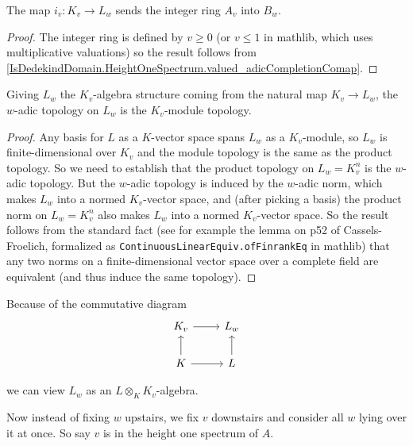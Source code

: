 \begin{theorem}
  \label{IsDedekindDomain.HeightOneSpectrum.adicCompletionComapSemialgHom.mapadicCompletionIntegers}
  \leanok
  The map $i_v:K_v\to L_w$ sends the integer ring $A_v$ into $B_w$.
\end{theorem}
\begin{proof}
  \leanok
  The integer ring is defined by $v\geq0$ (or $v\leq 1$ in mathlib, which uses multiplicative
  valuations) so the result follows from \ref{IsDedekindDomain.HeightOneSpectrum.valued_adicCompletionComap}.
\end{proof}
\begin{theorem}
  \label{IsDedekindDomain.HeightOneSpectrum.adicCompletionComap_isModuleTopology}
  \leanok
  Giving $L_w$ the $K_v$-algebra structure coming from the natural map $K_v\to L_w$,
  the $w$-adic topology on $L_w$ is the $K_v$-module topology.
\end{theorem}
\begin{proof}
  Any basis for $L$ as a $K$-vector space spans $L_w$ as a $K_v$-module, so $L_w$ is
  finite-dimensional over $K_v$ and the module topology is the same as the product
  topology. So we need to establish that the product topology on $L_w=K_v^n$ is
  the $w$-adic topology. But the $w$-adic topology is induced by the $w$-adic norm,
  which makes $L_w$ into a normed $K_v$-vector space, and (after picking a basis)
  the product norm on $L_w=K_v^n$ also makes $L_w$ into a normed $K_v$-vector space.
  So the result follows from the standard fact (see for example the lemma on p52
  of Cassels-Froelich, formalized as {\tt ContinuousLinearEquiv.ofFinrankEq} in mathlib)
  that any two norms on a finite-dimensional vector space over
  a complete field are equivalent (and thus induce the same topology).
\end{proof}

Because of the commutative diagram
\[
\begin{tikzcd}
K_v \arrow{r} & L_w  \\
K \arrow{u} \arrow{r} & L \arrow{u}
\end{tikzcd}
\]

we can view $L_w$ as an $L\otimes_KK_v$-algebra.

Now instead of fixing $w$ upstairs, we fix $v$ downstairs and consider all $w$ lying
over it at once. So say $v$ is in the height one spectrum of $A$.

